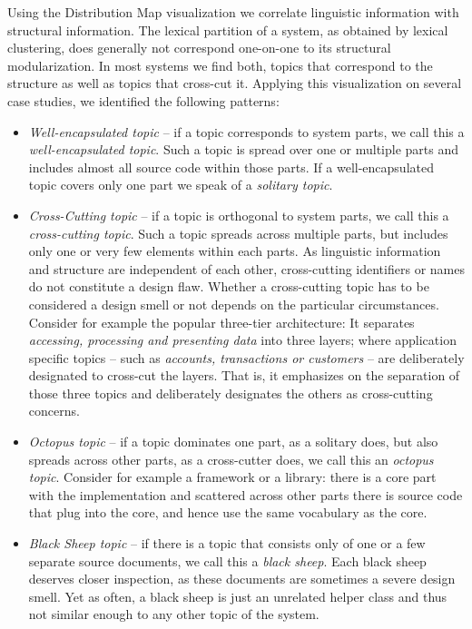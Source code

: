 Using the Distribution Map visualization we correlate linguistic information with structural information. The lexical partition of a system, as obtained by lexical clustering, does generally not correspond one-on-one to its structural modularization. In most systems we find both, topics that correspond to the structure as well as topics that cross-cut it. Applying this visualization on several case studies, we identified the following patterns:

\begin{itemize}
  \item \emph{Well-encapsulated topic} -- if a topic corresponds to system parts, we call this a \emph{well-encapsulated topic}. Such a topic is spread over one or multiple parts and includes almost all source code within those parts. If a well-encapsulated topic covers only one part we speak of a \emph{solitary topic}.

  \item \emph{Cross-Cutting topic} -- if a topic is orthogonal to system parts, we call this a \emph{cross-cutting topic}. Such a topic spreads across multiple parts, but includes only one or very few elements within each parts. As linguistic information and structure are independent of each other, cross-cutting identifiers or names do not constitute a design flaw. Whether a cross-cutting topic has to be considered a design smell or not depends on the particular circumstances. Consider for example the popular three-tier architecture: It separates \emph{accessing, processing \emph{and} presenting data} into three layers; where application specific topics -- such as \eg \emph{accounts, transactions \emph{or} customers} -- are deliberately designated to cross-cut the layers. That is, it emphasizes on the separation of those three topics and deliberately designates the others as cross-cutting concerns.

 \item \emph{Octopus topic} -- if a topic dominates one part, as a solitary does, but also spreads across other parts, as a cross-cutter does, we call this an \emph{octopus topic}. Consider for example a framework or a library: there is a core part with the implementation and scattered across other parts there is source code that plug into the core, and hence use the same vocabulary as the core.

  \item \emph{Black Sheep topic} -- if there is a topic that consists only of one or a few separate source documents, we call this a \emph{black sheep}. Each black sheep deserves closer inspection, as these documents are sometimes a severe design smell. Yet as often, a black sheep is just an unrelated helper class and thus not similar enough to any other topic of the system.
\end{itemize}

